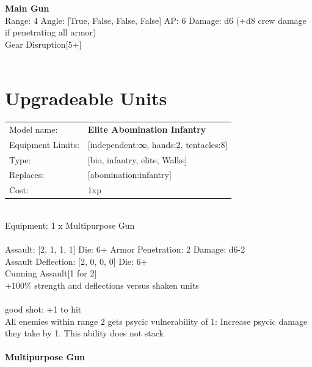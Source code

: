 {\bf Main Gun } \\



Range: 4  Angle: [True, False, False, False] AP: 6 Damage: d6 (+d8 crew damage if penetrating all armor) \\
Gear Disruption[5+]\\ 




 
\ \\













\section{Upgradeable Units}\noindent
\begin{tabular}{ll}
Model name: &{\bf Elite Abomination Infantry } \\
Equipment Limits: &[independent:∞, hands:2, tentacles:8] \\
Type: &[bio, infantry, elite, Walks] \\
Replaces: &[abomination:infantry] \\
Cost: & 1xp\\
\end{tabular}
\ \\
Equipment: 1 x Multipurpose Gun \\
\ \\
Assault: [2, 1, 1, 1] Die: 6+ Armor Penetration: 2 Damage: d6-2 \\
Assault Deflection: [2, 0, 0, 0] Die: 6+\\
\indent Cunning Assault[1 for 2]\\ 
+100\% strength and deflections versus shaken units\\ 
 
\ \\
good shot: +1 to hit\\ 
All enemies within range 2 gets psycic vulnerability of 1: Increase psycic damage they take by 1. This ability does not stack\\ 

\ \\
{\bf Multipurpose Gun } \\



